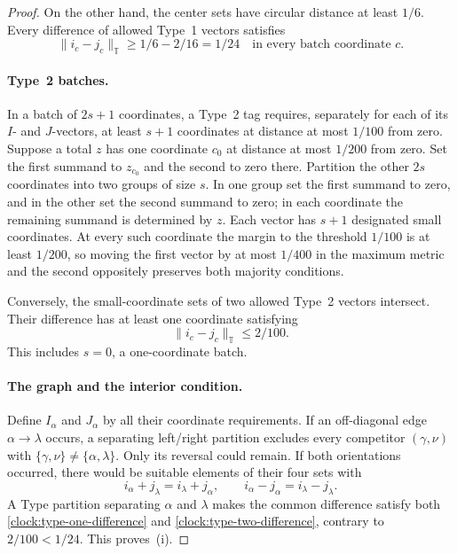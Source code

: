 \begin{proof}
On the other hand, the center sets have circular distance at least
$1/6$. Every difference of allowed Type~1 vectors satisfies
\begin{equation}\label{clock:type-one-difference}
              \|i_c-j_c\|_{\mathbb T}
                 \ge 1/6-2/16=1/24
                 \quad\text{in every batch coordinate }c.
\end{equation}

\paragraph{Type~2 batches.}
In a batch of $2s+1$ coordinates, a Type~2 tag requires, separately
for each of its $I$- and $J$-vectors, at least $s+1$ coordinates at
distance at most $1/100$ from zero. Suppose a total $z$ has one
coordinate $c_0$ at distance at most $1/200$ from zero. Set the first
summand to $z_{c_0}$ and the second to zero there. Partition the other
$2s$ coordinates into two groups of size $s$. In one group set the
first summand to zero, and in the other set the second summand to
zero; in each coordinate the remaining summand is determined by $z$.
Each vector has $s+1$ designated small coordinates. At every such
coordinate the margin to the threshold $1/100$ is at least $1/200$,
so moving the first vector by at most $1/400$ in the maximum metric
and the second oppositely preserves both majority conditions.

Conversely, the small-coordinate sets of two allowed Type~2 vectors
intersect. Their difference has at least one coordinate satisfying
\begin{equation}\label{clock:type-two-difference}
                            \|i_c-j_c\|_{\mathbb T}\le2/100.
\end{equation}
This includes $s=0$, a one-coordinate batch.

\paragraph{The graph and the interior condition.}
Define $I_\alpha$ and $J_\alpha$ by all their coordinate requirements.
If an off-diagonal edge $\alpha\to\lambda$ occurs, a separating
left/right partition excludes every competitor
$(\gamma,\nu)$ with $\{\gamma,\nu\}\ne\{\alpha,\lambda\}$.
Only its reversal could remain. If both orientations occurred, there
would be suitable elements of their four sets with
\[
 i_\alpha+j_\lambda=i_\lambda+j_\alpha,
 \qquad i_\alpha-j_\alpha=i_\lambda-j_\lambda.
\]
A Type partition separating $\alpha$ and $\lambda$ makes the common
difference satisfy both \eqref{clock:type-one-difference} and
\eqref{clock:type-two-difference}, contrary to $2/100<1/24$.
This proves~\textup{(i)}.


\end{proof}

